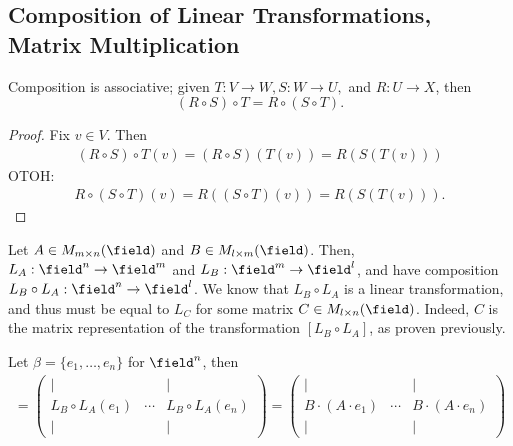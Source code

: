 \subsection{Composition of Linear Transformations, Matrix Multiplication}

\begin{proposition}
    Composition is associative; given $T : V \to W, S : W \to U,$ and $R : U \to X$, then \[
    (R \circ S) \circ T = R \circ (S \circ T).
    \]
\end{proposition}
\begin{proof}
    Fix $v \in V$. Then \begin{align*}
        (R \circ S) \circ T(v) = (R\circ S)(T(v)) = R (S(T(v)))
    \end{align*}
    OTOH:
    \begin{align*}
        R\circ (S\circ T)(v) = R((S\circ T)(v)) = R(S(T(v))).
    \end{align*}
\end{proof}

Let $A \in M_{m \times n}(\field)$ and $B \in M_{l \times m}(\field)$. Then, $L_A : \field^n \to \field^m$ and $L_B : \field^m \to \field^l$, and have composition $L_B \circ L_A : \field^n \to \field^l$. We know that $L_B \circ L_A$ is a linear transformation, and thus must be equal to $L_C$ for some matrix $C \in M_{l \times n}(\field)$. Indeed, $C$ is the matrix representation of the transformation $[L_B \circ L_A]$, as proven previously. 

Let $\beta = \{e_1, \dots, e_n\}$ for $\field^n$, then
\begin{align*}
    [L_B \circ L_A] = \begin{pmatrix}
        \vert &  &  \vert \\
        L_B \circ L_A(e_1) & \cdots & L_B\circ L_A(e_n)\\
        \vert &  & \vert
    \end{pmatrix} = \begin{pmatrix}
        \vert &  & \vert \\
        B\cdot (A \cdot e_1) & \cdots & B \cdot (A \cdot e_n)\\
        \vert & & \vert
    \end{pmatrix}
\end{align*}


